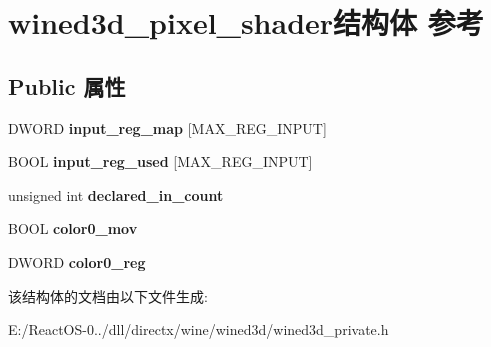 \hypertarget{structwined3d__pixel__shader}{}\section{wined3d\+\_\+pixel\+\_\+shader结构体 参考}
\label{structwined3d__pixel__shader}
\subsection*{Public 属性}
\begin{DoxyCompactItemize}
\item 
\mbox{\label{structwined3d__pixel__shader_af5f7bac6a8411c1341e4991d7395df8c}} 
D\+W\+O\+RD {\bfseries input\+\_\+reg\+\_\+map} \mbox{[}M\+A\+X\+\_\+\+R\+E\+G\+\_\+\+I\+N\+P\+UT\mbox{]}
\item 
\mbox{\label{structwined3d__pixel__shader_ab8c7160ab3110f6363be01e0841a0e2b}} 
B\+O\+OL {\bfseries input\+\_\+reg\+\_\+used} \mbox{[}M\+A\+X\+\_\+\+R\+E\+G\+\_\+\+I\+N\+P\+UT\mbox{]}
\item 
\mbox{\label{structwined3d__pixel__shader_a57181f692a704da31bb5d7cec51e3baa}} 
unsigned int {\bfseries declared\+\_\+in\+\_\+count}
\item 
\mbox{\label{structwined3d__pixel__shader_acf52e04d84593991a0bae95e627ff44d}} 
B\+O\+OL {\bfseries color0\+\_\+mov}
\item 
\mbox{\label{structwined3d__pixel__shader_aa8ce4e2fbfa568a131adf96d62e1a35f}} 
D\+W\+O\+RD {\bfseries color0\+\_\+reg}
\end{DoxyCompactItemize}


该结构体的文档由以下文件生成\+:\begin{DoxyCompactItemize}
\item 
E\+:/\+React\+O\+S-\/0../dll/directx/wine/wined3d/wined3d\+\_\+private.\+h\end{DoxyCompactItemize}
